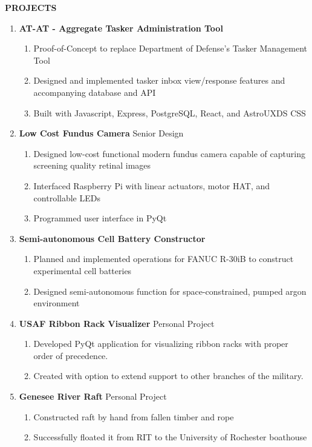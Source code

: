 \documentclass[11pt]{article}
\begin{document}
\bigbreak
{\Large \textbf{PROJECTS}}
\begin{enumerate}[label={}, itemsep=5pt]
	\item	\textbf{AT-AT - Aggregate Tasker Administration Tool}
			\begin{enumerate}[label={--}]
				\item Proof-of-Concept to replace Department of Defense's Tasker Management Tool
				\item Designed and implemented tasker inbox view/response features and accompanying database and API
				\item Built with Javascript, Express, PostgreSQL, React, and AstroUXDS CSS
			\end{enumerate}
	\item	\textbf{Low Cost Fundus Camera} \textbar{} Senior Design
			\begin{enumerate}[label={--}]
				\item Designed low-cost functional modern fundus camera capable of capturing screening quality retinal images
				\item Interfaced Raspberry Pi with linear actuators, motor HAT, and controllable LEDs
				\item Programmed user interface in PyQt
			\end{enumerate}
	\item	\textbf{Semi-autonomous Cell Battery Constructor}
			\begin{enumerate}[label={--}]
				\item Planned and implemented operations for FANUC R-30iB to construct experimental cell batteries
				\item Designed semi-autonomous function for space-constrained, pumped argon environment
			\end{enumerate}
	\item	\textbf{USAF Ribbon Rack Visualizer} \textbar{} Personal Project
			\begin{enumerate}[label={--}]
				\item Developed PyQt application for visualizing ribbon racks with proper order of precedence.
				\item Created with option to extend support to other branches of the military.
			\end{enumerate}
	\item	\textbf{Genesee River Raft} \textbar{} Personal Project
			\begin{enumerate}[label={--}]
				\item Constructed raft by hand from fallen timber and rope
				\item Successfully floated it from RIT to the University of Rochester boathouse
			\end{enumerate}
\end{enumerate}
\end{document}
